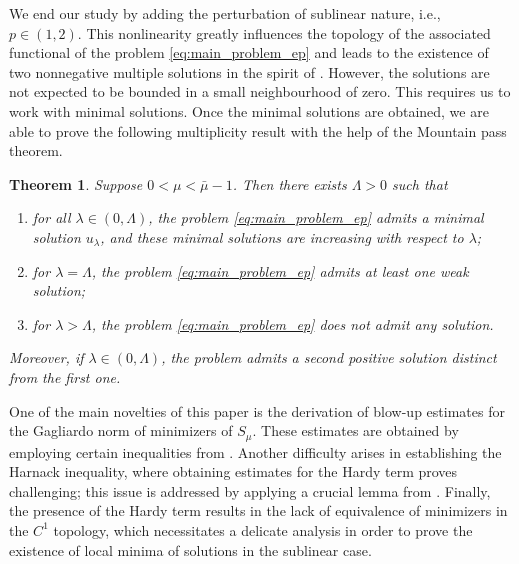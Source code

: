 \documentclass[11pt]{article}
\newtheorem{theorem}{Theorem}[section] %
\begin{document}
We end our study by adding the perturbation of sublinear nature, i.e., $p \in (1,2)$. This nonlinearity greatly influences the topology of the associated functional of the problem \eqref{eq:main_problem_ep} and leads to the existence of two nonnegative multiple solutions in the spirit of \cite{abc_laplacian}. However, the solutions are not expected to be bounded in a small neighbourhood of zero. This requires us to work with minimal solutions. Once the minimal solutions are obtained, we are able to prove the following multiplicity result with the help of the Mountain pass theorem. 
\begin{theorem}\label{thm:sublinear_two_solutions}
Suppose \(0 < \mu < \bar{\mu} - 1\). Then there exists \(\Lambda > 0\) such that  
\begin{enumerate}
    \item for all \(\lambda \in (0, \Lambda)\), the problem \eqref{eq:main_problem_ep} admits a minimal solution \(u_{\lambda}\), and these minimal solutions are increasing with respect to \(\lambda\);  
    \item for \(\lambda = \Lambda\), the problem \eqref{eq:main_problem_ep} admits at least one weak solution;  
    \item for \(\lambda > \Lambda\), the problem \eqref{eq:main_problem_ep} does not admit any solution.  
\end{enumerate}
Moreover, if \(\lambda \in (0, \Lambda)\), the problem admits a second positive solution distinct from the first one.
\end{theorem}

One of the main novelties of this paper is the derivation of blow-up estimates for the Gagliardo norm of minimizers of \(S_{\mu}\). These estimates are obtained by employing certain inequalities from \cite{giovanni_fractional_book}. Another difficulty arises in establishing the Harnack inequality, where obtaining estimates for the Hardy term proves challenging; this issue is addressed by applying a crucial lemma from \cite{stein_weiss1957fractional}. Finally, the presence of the Hardy term results in the lack of equivalence of minimizers in the \(C^1\) topology, which necessitates a delicate analysis in order to prove the existence of local minima of solutions in the sublinear case.
\end{document}

